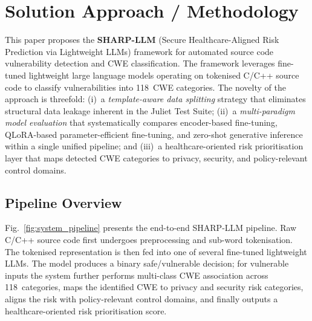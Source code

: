 
\section{Solution Approach / Methodology}
\label{sec:methodology}

This paper proposes the \textbf{SHARP-LLM} (Secure Healthcare-Aligned Risk
Prediction via Lightweight LLMs) framework for automated source code
vulnerability detection and CWE classification.  The framework leverages
fine-tuned lightweight large language models operating on tokenised C/C++
source code to classify vulnerabilities into 118~CWE categories.  The
novelty of the approach is threefold: (i)~a \emph{template-aware data
splitting} strategy that eliminates structural data leakage inherent in the
Juliet Test Suite; (ii)~a \emph{multi-paradigm model evaluation} that
systematically compares encoder-based fine-tuning, QLoRA-based
parameter-efficient fine-tuning, and zero-shot generative inference within a
single unified pipeline; and (iii)~a healthcare-oriented risk
prioritisation layer that maps detected CWE categories to privacy, security,
and policy-relevant control domains.

\subsection{Pipeline Overview}
\label{sec:pipeline}

Fig.~\ref{fig:system_pipeline} presents the end-to-end SHARP-LLM pipeline.
Raw C/C++ source code first undergoes preprocessing and sub-word
tokenisation.  The tokenised representation is then fed into one of several
fine-tuned lightweight LLMs.  The model produces a binary safe/vulnerable
decision; for vulnerable inputs the system further performs multi-class CWE
association across 118~categories, maps the identified CWE to privacy and
security risk categories, aligns the risk with policy-relevant control
domains, and finally outputs a healthcare-oriented risk prioritisation
score.

